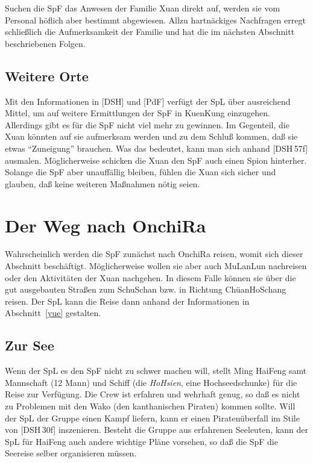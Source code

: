 \documentclass[
a4paper,
twoside,
DIV=calc,
BCOR=4mm,
fontsize=9pt,
twocolumn=on,
titlepage=on,
parskip=half
]{scrartcl}
\begin{document}
Suchen die SpF das Anwesen der Familie Xuan direkt auf, werden sie vom
Personal höflich aber bestimmt abgewiesen. Allzu hartnäckiges
Nachfragen erregt schließlich die Aufmerksamkeit der Familie und hat
die im nächsten Abschnitt beschriebenen Folgen.

\subsection{Weitere Orte}

Mit den Informationen in [DSH] und [PdF] verfügt der SpL über
ausreichend Mittel, um auf weitere Ermittlungen der SpF in KuenKung
einzugehen. Allerdings gibt es für die SpF nicht viel mehr zu
gewinnen. Im Gegenteil, die Xuan könnten auf sie aufmerksam werden
und zu dem Schluß kommen, daß sie etwas "`Zuneigung"' brauchen. Was
das bedeutet, kann man sich anhand [DSH\,57f] ausmalen. Möglicherweise
schicken die Xuan den SpF auch einen Spion hinterher. Solange die SpF
aber unauffällig bleiben, fühlen die Xuan sich sicher und glauben,
daß keine weiteren Maßnahmen nötig seien.

\section{Der Weg nach OnchiRa}

Wahrscheinlich werden die SpF zunächst nach OnchiRa reisen, womit sich
dieser Abschnitt beschäftigt. Möglicherweise wollen sie aber auch
MuLanLun nachreisen oder den Aktivitäten der Xuan nachgehen. In diesem
Falle können sie über die gut ausgebauten Straßen zum SchuSchan
bzw. in Richtung ChüanHoSchang reisen. Der SpL kann die Reise dann
anhand der Informationen in Abschnitt~\ref{yue} gestalten.

\subsection{Zur See}

Wenn der SpL es den SpF nicht zu schwer machen will, stellt Ming
HaiFeng samt Mannschaft (12 Mann) und Schiff (die \emph{HoHsien}, eine
Hochseedschunke) für die Reise zur Verfügung. Die Crew ist erfahren
und wehrhaft genug, so daß es nicht zu Problemen mit den Wako (den
kanthanischen Piraten) kommen sollte. Will der SpL der Gruppe einen
Kampf liefern, kann er einen Piratenüberfall im Stile von [DSH\,30f]
inszenieren. Besteht die Gruppe aus erfahrenen Seeleuten, kann der SpL
für HaiFeng auch andere wichtige Pläne vorsehen, so daß die SpF die
Seereise selber organisieren müssen.
\end{document}
